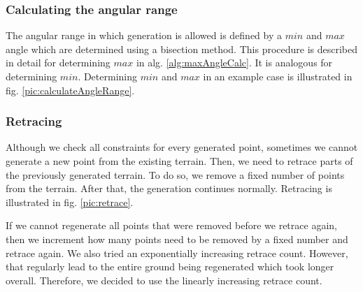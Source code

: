 \subsubsection{Calculating the angular range}
\label{angleRange}
The angular range in which generation is allowed is defined by a $min$ and $max$ angle which are determined using a bisection method.
This procedure is described in detail for determining $max$ in alg. \ref{alg:maxAngleCalc}.
It is analogous for determining $min$. 
Determining $min$ and $max$ in an example case is illustrated in fig. \ref{pic:calculateAngleRange}.

\vspace{-\abovedisplayskip}

\subsubsection{Retracing}
\label{retracing}
Although we check all constraints for every generated point, sometimes we cannot generate a new point from the existing terrain. 
Then, we need to retrace parts of the previously generated terrain.
To do so, we remove a fixed number of points from the terrain. 
After that, the generation continues normally. Retracing is illustrated in fig. \ref{pic:retrace}.

\vspace{-\abovedisplayskip}
\vspace{-\abovedisplayskip}
\newpage
If we cannot regenerate all points that were removed before we retrace again, then we increment how many points need to be removed by a fixed number and retrace again.
We also tried an exponentially increasing retrace count. 
However, that regularly lead to the entire ground being regenerated which took longer overall. Therefore, we decided to use the linearly increasing retrace count.

